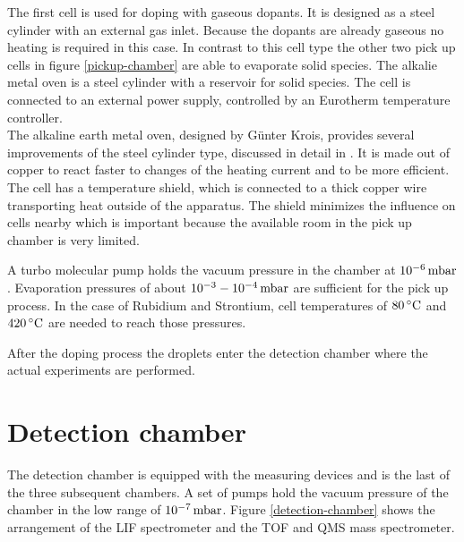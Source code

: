 \documentclass[parskip,12pt,headsepline,a4paper] {scrbook}
\begin{document}
The first cell is used for doping with gaseous dopants. It is designed as a steel cylinder with an external gas inlet. Because the dopants are already gaseous no heating is required in this case.
In contrast to this cell type the other two pick up cells in figure \ref{pickup-chamber} are able to evaporate solid species. The alkalie metal oven is a steel cylinder with a reservoir for solid species. The cell is connected to an external power supply, controlled by an Eurotherm temperature controller. \\
The alkaline earth metal oven, designed by G\"unter Krois, provides several improvements of the steel cylinder type, discussed in detail in \cite{krois}. It is made out of copper to react faster to changes of the heating current and to be more efficient. The cell has a temperature shield, which is connected to a thick copper wire transporting heat outside of the apparatus. The shield minimizes the influence on cells nearby which is important because the available room in the pick up chamber is very limited.

A turbo molecular pump holds the vacuum pressure in the chamber at $\unit[10^{-6}]{mbar}$. Evaporation pressures of about $\unit[10^{-3}-10^{-4}]{mbar}$ are sufficient for the pick up process. In the case of Rubidium and Strontium, cell temperatures of $\unit[80]{^\circ C}$ and $\unit[420]{^\circ C}$ are needed to reach those pressures.

After the doping process the droplets enter the detection chamber where the actual experiments are performed.


\section{Detection chamber}
\vspace{-1\baselineskip}
The detection chamber is equipped with the measuring devices and is the last of the three subsequent chambers. A set of pumps hold the vacuum pressure of the chamber in the low range of $\unit[10^{-7}]{mbar}$. Figure \ref{detection-chamber} shows the arrangement of the LIF spectrometer and the TOF and QMS mass spectrometer.
\end{document}
